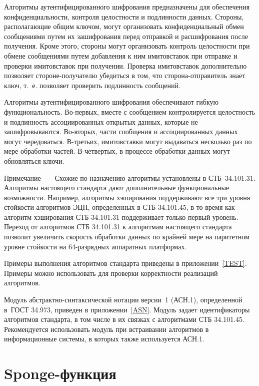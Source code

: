 Алгоритмы аутентифицированного шифрования предназначены для обеспечения 
конфиденциальности, контроля целостности и подлинности данных.
%
Стороны, располагающие общим ключом, могут организовать 
конфиденциальный обмен сообщениями путем их зашифрования 
перед отправкой и расшифрования после получения.
%
Кроме этого, стороны могут организовать контроль целостности при обмене 
сообщениями путем добавления к ним имитовставок при отправке 
и проверки имитовставок при получении.
%
Проверка имитовставок дополнительно позволяет стороне-получателю 
убедиться в том, что сторона-отправитель знает ключ,
т.~е. позволяет проверить подлинность сообщений.

Алгоритмы аутентифицированного шифрования обеспечивают гибкую функциональность.
%
Во-первых, вместе с сообщением контролируется целостность и подлинность 
ассоциированных открытых данных, которые не зашифровываются.
%
Во-вторых, части сообщения и ассоциированных данных могут чередоваться.
%
В-третьих, имитовставки могут выдаваться несколько раз по мере обработки 
частей.
%
В-четвертых, в процессе обработки данных могут обновляться ключи. 

\begin{note}
Примечание~---~Схожие по назначению алгоритмы установлены в СТБ~34.101.31. 
Алгоритмы настоящего стандарта дают дополнительные функциональные возможности.
Например, алгоритмы хэширования поддерживают все три уровня стойкости 
алгоритмов ЭЦП, определенных в СТБ 34.101.45, в то время как алгоритм 
хэширования СТБ 34.101.31 поддерживает только первый уровень.
%
Переход от алгоритмов СТБ 34.101.31 к алгоритмам настоящего стандарта позволит 
увеличить скорость обработки данных по крайней мере на паритетном уровне 
стойкости на 64-разрядных аппаратных платформах.
\end{note}

Примеры выполнения алгоритмов стандарта приведены в приложении~\ref{TEST}.
Примеры можно использовать для проверки корректности реализаций 
алгоритмов.

Модуль абстрактно-синтаксической нотации версии~1 (АСН.1), определенной 
в~ГОСТ 34.973, приведен в приложении~\ref{ASN}. Модуль задает идентификаторы 
алгоритмов стандарта, в том числе в их связках с алгоритмами СТБ 34.101.45.
%
Рекомендуется использовать модуль при встраивании алгоритмов в информационные
системы, в которых также используется АСН.1.

\section{Sponge-функция}\label{COMMON.F}

